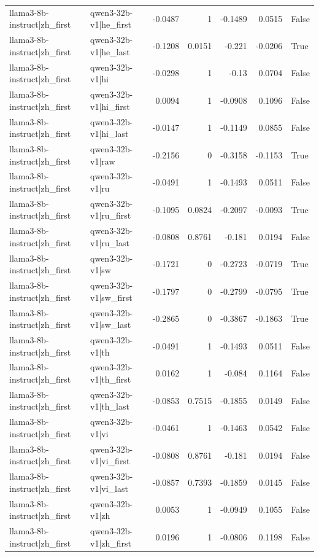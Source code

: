 \begin{table}
\begin{tabular}{l l r r r r l}
llama3-8b-instruct|zh_first & qwen3-32b-v1|he_first & -0.0487 & 1 & -0.1489 & 0.0515 & False \\
llama3-8b-instruct|zh_first & qwen3-32b-v1|he_last & -0.1208 & 0.0151 & -0.221 & -0.0206 & True \\
llama3-8b-instruct|zh_first & qwen3-32b-v1|hi & -0.0298 & 1 & -0.13 & 0.0704 & False \\
llama3-8b-instruct|zh_first & qwen3-32b-v1|hi_first & 0.0094 & 1 & -0.0908 & 0.1096 & False \\
llama3-8b-instruct|zh_first & qwen3-32b-v1|hi_last & -0.0147 & 1 & -0.1149 & 0.0855 & False \\
llama3-8b-instruct|zh_first & qwen3-32b-v1|raw & -0.2156 & 0 & -0.3158 & -0.1153 & True \\
llama3-8b-instruct|zh_first & qwen3-32b-v1|ru & -0.0491 & 1 & -0.1493 & 0.0511 & False \\
llama3-8b-instruct|zh_first & qwen3-32b-v1|ru_first & -0.1095 & 0.0824 & -0.2097 & -0.0093 & True \\
llama3-8b-instruct|zh_first & qwen3-32b-v1|ru_last & -0.0808 & 0.8761 & -0.181 & 0.0194 & False \\
llama3-8b-instruct|zh_first & qwen3-32b-v1|sw & -0.1721 & 0 & -0.2723 & -0.0719 & True \\
llama3-8b-instruct|zh_first & qwen3-32b-v1|sw_first & -0.1797 & 0 & -0.2799 & -0.0795 & True \\
llama3-8b-instruct|zh_first & qwen3-32b-v1|sw_last & -0.2865 & 0 & -0.3867 & -0.1863 & True \\
llama3-8b-instruct|zh_first & qwen3-32b-v1|th & -0.0491 & 1 & -0.1493 & 0.0511 & False \\
llama3-8b-instruct|zh_first & qwen3-32b-v1|th_first & 0.0162 & 1 & -0.084 & 0.1164 & False \\
llama3-8b-instruct|zh_first & qwen3-32b-v1|th_last & -0.0853 & 0.7515 & -0.1855 & 0.0149 & False \\
llama3-8b-instruct|zh_first & qwen3-32b-v1|vi & -0.0461 & 1 & -0.1463 & 0.0542 & False \\
llama3-8b-instruct|zh_first & qwen3-32b-v1|vi_first & -0.0808 & 0.8761 & -0.181 & 0.0194 & False \\
llama3-8b-instruct|zh_first & qwen3-32b-v1|vi_last & -0.0857 & 0.7393 & -0.1859 & 0.0145 & False \\
llama3-8b-instruct|zh_first & qwen3-32b-v1|zh & 0.0053 & 1 & -0.0949 & 0.1055 & False \\
llama3-8b-instruct|zh_first & qwen3-32b-v1|zh_first & 0.0196 & 1 & -0.0806 & 0.1198 & False \\

\end{tabular}
\end{table}
